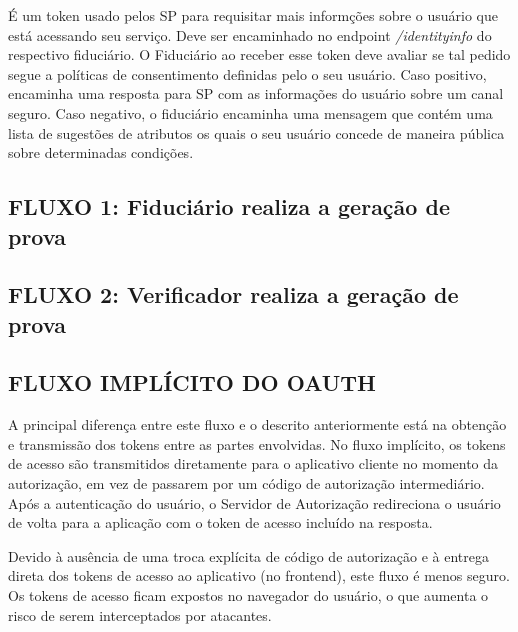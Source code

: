 É um token usado pelos \acs{SP} para requisitar mais informções sobre o usuário que está acessando seu serviço. Deve ser encaminhado no endpoint \textit{/identityinfo} do respectivo fiduciário. O Fiduciário ao receber esse token deve avaliar se tal pedido segue a políticas de consentimento definidas pelo o seu usuário. Caso positivo, encaminha uma resposta para \acs{SP} com as informações do usuário sobre um canal seguro. Caso negativo, o fiduciário encaminha uma mensagem que contém uma lista de sugestões de atributos os quais o seu usuário concede de maneira pública sobre determinadas condições.



\subsection{FLUXO 1: Fiduciário realiza a geração de prova}
\subsection{FLUXO 2: Verificador realiza a geração de prova}

\subsection{FLUXO IMPLÍCITO DO OAUTH}

A principal diferença entre este fluxo e o descrito anteriormente está na obtenção e transmissão dos tokens entre as partes envolvidas. No fluxo implícito, os tokens de acesso são transmitidos diretamente para o aplicativo cliente no momento da autorização, em vez de passarem por um código de autorização intermediário. Após a autenticação do usuário, o Servidor de Autorização redireciona o usuário de volta para a aplicação com o token de acesso incluído na resposta.

Devido à ausência de uma troca explícita de código de autorização e à entrega direta dos tokens de acesso ao aplicativo (no frontend), este fluxo é menos seguro. Os tokens de acesso ficam expostos no navegador do usuário, o que aumenta o risco de serem interceptados por atacantes.